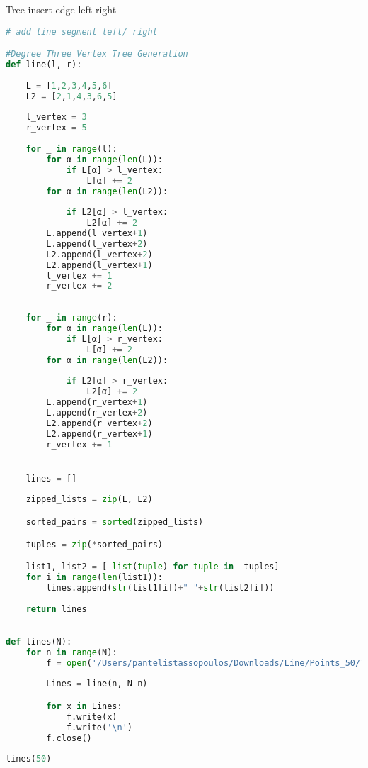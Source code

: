\documentclass{article}
\begin{document}
\begin{codeblock}{Tree insert edge left right}
\begin{lstlisting}[language=Python]
# add line segment left/ right

#Degree Three Vertex Tree Generation
def line(l, r):
    
    L = [1,2,3,4,5,6]
    L2 = [2,1,4,3,6,5]
    
    l_vertex = 3
    r_vertex = 5
    
    for _ in range(l):
        for α in range(len(L)):
            if L[α] > l_vertex:
                L[α] += 2
        for α in range(len(L2)):
            
            if L2[α] > l_vertex:
                L2[α] += 2
        L.append(l_vertex+1)
        L.append(l_vertex+2)
        L2.append(l_vertex+2)
        L2.append(l_vertex+1)
        l_vertex += 1
        r_vertex += 2
        
    
    for _ in range(r):
        for α in range(len(L)):
            if L[α] > r_vertex:
                L[α] += 2
        for α in range(len(L2)):
            
            if L2[α] > r_vertex:
                L2[α] += 2
        L.append(r_vertex+1)
        L.append(r_vertex+2)
        L2.append(r_vertex+2)
        L2.append(r_vertex+1)
        r_vertex += 1


    lines = []
    
    zipped_lists = zip(L, L2)

    sorted_pairs = sorted(zipped_lists)

    tuples = zip(*sorted_pairs)

    list1, list2 = [ list(tuple) for tuple in  tuples]
    for i in range(len(list1)):
        lines.append(str(list1[i])+" "+str(list2[i]))
        
    return lines
    

def lines(N):
    for n in range(N):
        f = open('/Users/pantelistassopoulos/Downloads/Line/Points_50/TreeLine50_'+str(n)+'_'+str(N-n)+'.txt', 'w')
    
        Lines = line(n, N-n)

        for x in Lines:
            f.write(x)
            f.write('\n')
        f.close()
    
lines(50)
\end{lstlisting}
    
\end{codeblock}




\end{document}

